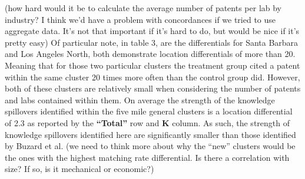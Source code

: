 \documentclass[12pt,letterpaper]{article}
\begin{document}
\par
{\color{red}(how hard would it be to calculate the average number of patents per lab by industry? I think we'd have a problem with concordances if we tried to use aggregate data. It's not that important if it's hard to do, but would be nice if it's pretty easy)} Of particular note, in table 3, are the differentials for Santa Barbara and Los Angeles North, both demonstrate location differentials of more than 20. Meaning that for those two particular clusters the treatment group cited a patent within the same cluster 20 times more often than the control group did. However, both of these clusters are relatively small when considering the number of patents and labs contained within them. On average the strength of the knowledge spillovers identified within the five mile general clusters is a location differential of 2.3 as reported by the \textbf{``Total''} row and \textbf{K} column. As such, the strength of knowledge spillovers identified here are significantly smaller than those identified by Buzard et al. 
{\color{blue}(we need to think more about why the ``new'' clusters would be the ones with the highest matching rate differential. Is there a correlation with size? If so, is it mechanical or economic?)}
\end{document}
